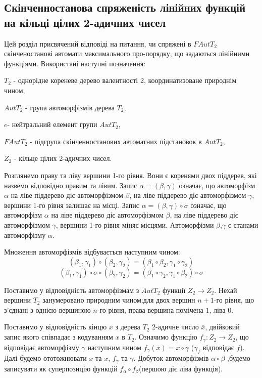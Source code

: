 \documentclass[a4paper,12pt]{article} \usepackage{a4wide}
\numberwithin{equation}{subsection}
\begin{document}
\subsection{Скінченностанова спряженість
лінійних  функцій на кільці цілих 2-адичних чисел}
Цей розділ присвячений відповіді на питання, чи спряжені в
$FAutT_2$ скінченостанові автомати максимального про-порядку, що
задаються лінійними функціями.
 Використані наступні позначення:


 $T_2$ - однорідне кореневе дерево валентності 2, координатизоване природнім чином,

$AutT_2$ - група автоморфізмів дерева $T_2$,

 $e$- нейтральний елемент групи $AutT_2$,

$FAutT_2$ - підгрупа скінченностанових автоматних підстановок в
$AutT_2$,

$Z_2$ - кільце цілих 2-адичних чисел.




 Розглянемо праву та ліву вершини 1-го рівня. Вони є коренями двох
 піддерев, які назвемо відповідно правим та лівим. Запис
 $\alpha=(\beta,\gamma)$ означає, що автоморфізм $\alpha$ на ліве
 піддерево діє автоморфізмом $\beta$, на ліве
 піддерево діє автоморфізмом $\gamma$, вершини 1-го рівня
 залишає на місці. Запис
 $\alpha=(\beta,\gamma)\circ  \sigma$ означає, що автоморфізм $\alpha$ на ліве
 піддерево діє автоморфізмом $\beta$, на ліве
 піддерево діє автоморфізмом $\gamma$, вершини 1-го рівня
 міняє місцями. Автоморфізми $\beta$,$\gamma$ є станами автоморфізму $\alpha$.

Множення автоморфізмів відбувається наступним чином: $$
(\beta_1,\gamma_1)\circ (\beta_2,\gamma_2)=(\beta_1 \circ \beta_2
,\gamma_1 \circ \gamma_2 ) $$ $$(\beta_1,\gamma_1)\circ \sigma
\circ (\beta_2,\gamma_2)=(\beta_1 \circ \gamma_2 ,\gamma_1 \circ
\beta_2 ) \circ \sigma$$

 Поставимо  у відповідність автоморфізмам з $AutT_2$ функції $Z_2\rightarrow Z_2$.
 Нехай вершини $T_2$ занумеровано природним
 чином:для двох вершин $n+1$-го рівня, що з'єднані з однією вершиною $n$-го рівня, права вершина
  помічена $1$, ліва $0$.

  Поставимо  у відповідність кінцю $x$ з дерева $T_2$ 2-адичне число $\overline{x}$,
 двійковий запис якого співпадає з кодуванням
  $x$ в $T_2$. Означимо функцію $f_{\gamma}:Z_2\rightarrow Z_2$, що відповідає автоморфізму $\gamma$ наступним
  чином $f_{\gamma}(\overline{x})=x\circ\gamma$ ($\gamma_f$ відповідає $f$). Далі будемо ототожнювати $x$ та $\overline{x}$,
    $f_\gamma$ та $\gamma$. Добуток автоморфізмів $\alpha \circ  \beta$ ,будемо записувати як суперпозицію функцій
    $f_{\alpha}\circ  f_{\beta}$(першою діє ліва функція).
\end{document}
